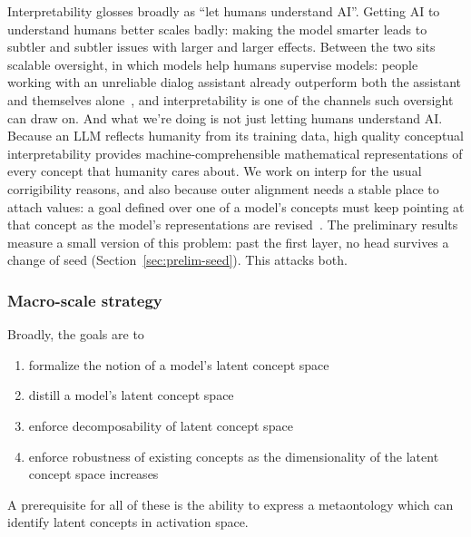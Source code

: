Interpretability glosses broadly as ``let humans understand AI''. Getting
AI to understand humans better scales badly: making the model smarter
leads to subtler and subtler issues with larger and larger effects.
Between the two sits scalable oversight, in which models help humans
supervise models: people working with an unreliable dialog assistant
already outperform both the assistant and themselves
alone~\cite{bowman2022}, and interpretability is one of the channels such
oversight can draw on. And what we're doing is not just
letting humans understand AI. Because an LLM reflects humanity from its
training data, high quality conceptual interpretability provides
machine-comprehensible mathematical representations of every concept
that humanity cares about. We work on interp for the usual
corrigibility reasons, and also because outer alignment needs a stable
place to attach values: a goal defined over one of a model's concepts
must keep pointing at that concept as the model's representations are
revised~\cite[Ch.~12]{bostrom2014}. The preliminary results measure a
small version of this problem: past the first layer, no head survives a
change of seed (Section~\ref{sec:prelim-seed}). This attacks both.

\subsubsection{Macro-scale strategy}
Broadly, the goals are to
\begin{enumerate}
  \item formalize the notion of a model's latent concept space
  \item distill a model's latent concept space
  \item enforce decomposability of latent concept space
  \item enforce robustness of existing concepts as the dimensionality of
  the latent concept space increases
\end{enumerate}
A prerequisite for all of these is the ability to express a
metaontology
which can identify latent concepts in activation space.


